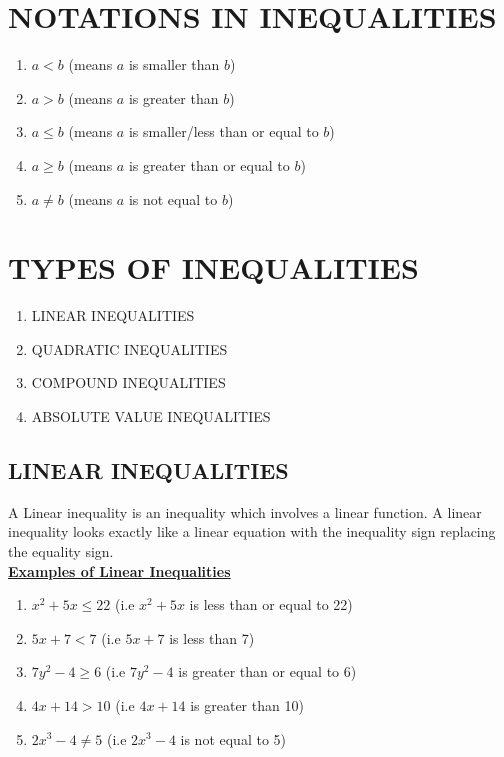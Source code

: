 \documentclass[12pt]{report}
\newcommand{\ubt}[1]{\textbf{\underline{#1}}}
\newcommand{\NI}{\noindent}
\begin{document}
	\section{NOTATIONS IN INEQUALITIES}
	\begin{enumerate}
		\item $a<b$ (means $a$ is smaller than $b$)
		\item $a>b$ (means $a$ is greater than $b$)
		\item $a \leq b$ (means $a$ is smaller/less than or equal to $b$)
		\item $a \geq b$ (means $a$ is greater than or equal to $b$)
		\item $a \neq b$ (means $a$ is not equal to $b$)
	\end{enumerate}
		
	\section{TYPES OF INEQUALITIES}
	\begin{enumerate}
		\item LINEAR INEQUALITIES
		\item QUADRATIC INEQUALITIES
		\item COMPOUND INEQUALITIES
		\item ABSOLUTE VALUE INEQUALITIES
	\end{enumerate}
		
	\subsection{LINEAR INEQUALITIES}
	A Linear inequality is an inequality which involves a linear function. A linear inequality looks exactly like a linear equation with the inequality sign replacing the equality sign.\\
		
	\NI \ubt{Examples of Linear Inequalities}
	\begin{enumerate}
		\item $x^2 + 5x \leq 22$ (i.e $x^2 + 5x$ is less than or equal to 22)
			
		\item $5x + 7 < 7$ (i.e $5x + 7$ is less than 7)
			
		\item $7y^2 - 4 \geq 6$ (i.e $7y^2 - 4$ is greater than or equal to 6)
			
		\item $4x + 14 > 10$ (i.e $4x + 14$ is greater than 10)
			
		\item $2x^3 - 4 \neq 5$ (i.e $2x^3 - 4$ is not equal to 5)
	\end{enumerate}
	
\end{document}
